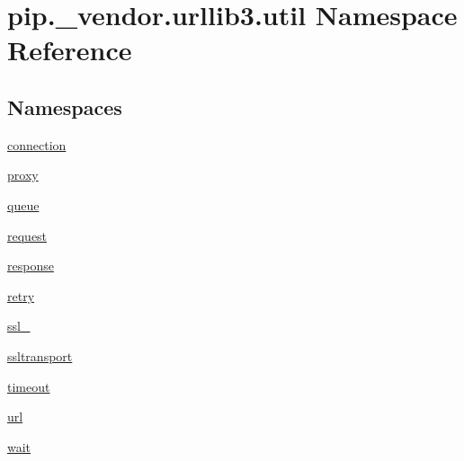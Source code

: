 \hypertarget{namespacepip_1_1__vendor_1_1urllib3_1_1util}{}\section{pip.\+\_\+vendor.\+urllib3.\+util Namespace Reference}
\label{namespacepip_1_1__vendor_1_1urllib3_1_1util}
\subsection*{Namespaces}
\begin{DoxyCompactItemize}
\item 
 \hyperlink{namespacepip_1_1__vendor_1_1urllib3_1_1util_1_1connection}{connection}
\item 
 \hyperlink{namespacepip_1_1__vendor_1_1urllib3_1_1util_1_1proxy}{proxy}
\item 
 \hyperlink{namespacepip_1_1__vendor_1_1urllib3_1_1util_1_1queue}{queue}
\item 
 \hyperlink{namespacepip_1_1__vendor_1_1urllib3_1_1util_1_1request}{request}
\item 
 \hyperlink{namespacepip_1_1__vendor_1_1urllib3_1_1util_1_1response}{response}
\item 
 \hyperlink{namespacepip_1_1__vendor_1_1urllib3_1_1util_1_1retry}{retry}
\item 
 \hyperlink{namespacepip_1_1__vendor_1_1urllib3_1_1util_1_1ssl__}{ssl\+\_\+}
\item 
 \hyperlink{namespacepip_1_1__vendor_1_1urllib3_1_1util_1_1ssltransport}{ssltransport}
\item 
 \hyperlink{namespacepip_1_1__vendor_1_1urllib3_1_1util_1_1timeout}{timeout}
\item 
 \hyperlink{namespacepip_1_1__vendor_1_1urllib3_1_1util_1_1url}{url}
\item 
 \hyperlink{namespacepip_1_1__vendor_1_1urllib3_1_1util_1_1wait}{wait}
\end{DoxyCompactItemize}
